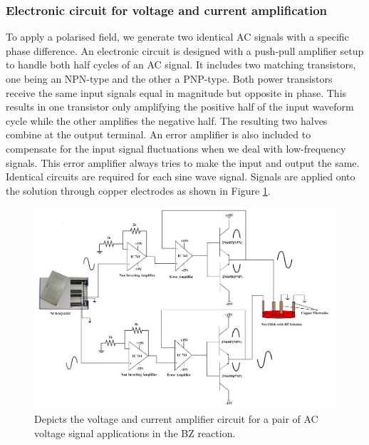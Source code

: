 \documentclass[journal=jacsat,manuscript=article]{achemso}
\begin{document}
\subsubsection{Electronic circuit for voltage and current amplification}
To apply a polarised field, we generate two identical AC signals with
a specific phase difference. An electronic circuit is designed with a
push-pull amplifier setup to handle both half cycles of an AC signal.
It includes two matching transistors, one being an NPN-type and the
other a PNP-type. Both power transistors receive the same input
signals equal in magnitude but opposite in phase. This results in one
transistor only amplifying the positive half of the input waveform
cycle while the other amplifies the negative half. The resulting two
halves combine at the output terminal. An error amplifier is also
included to compensate for the input signal fluctuations when we deal
with low-frequency signals. This error amplifier always tries to make
the input and output the same. Identical circuits are required for
each sine wave signal. Signals are applied onto the solution through
copper electrodes as shown in Figure \ref{fig:ex6}.
\begin{figure}[H]
    \centering
    \includegraphics[width=\linewidth]{CPEF - Copy.jpg}
    \caption{Depicts the voltage and current amplifier circuit for a
      pair of AC voltage signal applications in the BZ reaction.}
    \label{fig:ex6}
\end{figure}
\end{document}
